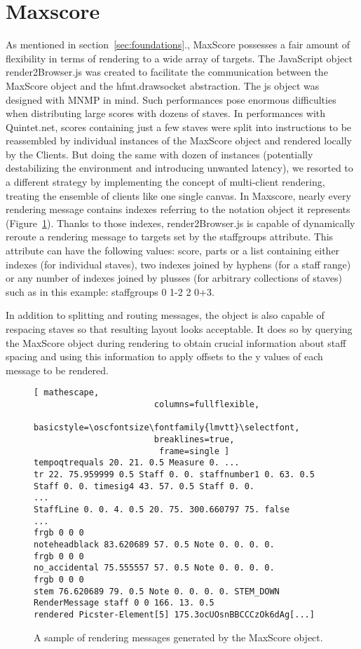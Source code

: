 \section{Maxscore}
As mentioned in section~\ref{sec:foundations}., MaxScore possesses a fair amount of flexibility in terms of rendering to a wide array of targets. The JavaScript object render2Browser.js was created to facilitate the communication between the MaxScore object and the hfmt.drawsocket abstraction. The js object was designed with MNMP in mind. Such performances pose enormous difficulties when distributing large scores with dozens of staves. In performances with Quintet.net, scores containing just a few staves were split into instructions to be reassembled by individual instances of the MaxScore object and rendered locally by the Clients. But doing the same with dozen of instances (potentially destabilizing the environment and introducing unwanted latency), we resorted to a different strategy by implementing the concept of multi-client rendering, treating the ensemble of clients like one single canvas. In Maxscore, nearly every rendering message contains indexes referring to the notation object it represents  (Figure~\ref{fig:maxscore-mesages}). Thanks to those indexes, render2Browser.js is capable of dynamically reroute a rendering message to targets set by the staffgroups attribute. This attribute can have the following values: score, parts or a list containing either indexes (for individual staves), two indexes joined by hyphens (for a staff range) or any number of indexes joined by plusses (for arbitrary collections of staves) such as in this example: staffgroups 0 1-2 2 0+3.

In addition to splitting and routing messages, the object is also capable of respacing staves so that resulting layout looks acceptable. It does so by querying the MaxScore object during rendering to obtain crucial information about staff spacing and using this information to apply offsets to the y values of each message to be rendered.

\begin{figure}[h]
\centering
\begin{lstlisting}[ mathescape,
						columns=fullflexible,
						basicstyle=\oscfontsize\fontfamily{lmvtt}\selectfont,
						breaklines=true,
						 frame=single ]
tempoqtrequals 20. 21. 0.5 Measure 0. ...
tr 22. 75.959999 0.5 Staff 0. 0. staffnumber1 0. 63. 0.5 Staff 0. 0. timesig4 43. 57. 0.5 Staff 0. 0.
...
StaffLine 0. 0. 4. 0.5 20. 75. 300.660797 75. false
...
frgb 0 0 0
noteheadblack 83.620689 57. 0.5 Note 0. 0. 0. 0.
frgb 0 0 0
no_accidental 75.555557 57. 0.5 Note 0. 0. 0. 0.
frgb 0 0 0
stem 76.620689 79. 0.5 Note 0. 0. 0. 0. STEM_DOWN
RenderMessage staff 0 0 166. 13. 0.5 
rendered Picster-Element[5] 175.3ocUOsnBBCCCzOk6dAg[...]
\end{lstlisting}

\caption{A sample of rendering messages generated by the MaxScore object. 
\label{fig:maxscore-mesages}}
\end{figure}

